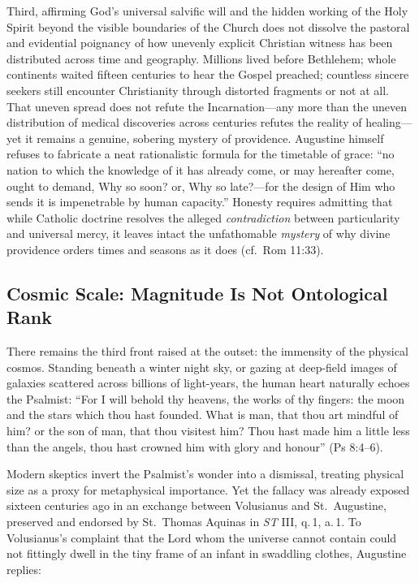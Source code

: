 Third, affirming God's universal salvific will and the hidden working of the Holy Spirit beyond the visible boundaries of the Church does not dissolve the pastoral and evidential poignancy of how unevenly explicit Christian witness has been distributed across time and geography. Millions lived before Bethlehem; whole continents waited fifteen centuries to hear the Gospel preached; countless sincere seekers still encounter Christianity through distorted fragments or not at all. That uneven spread does not refute the Incarnation---any more than the uneven distribution of medical discoveries across centuries refutes the reality of healing---yet it remains a genuine, sobering mystery of providence. Augustine himself refuses to fabricate a neat rationalistic formula for the timetable of grace: ``no nation to which the knowledge of it has already come, or may hereafter come, ought to demand, Why so soon? or, Why so late?---for the design of Him who sends it is impenetrable by human capacity.'' Honesty requires admitting that while Catholic doctrine resolves the alleged \emph{contradiction} between particularity and universal mercy, it leaves intact the unfathomable \emph{mystery} of why divine providence orders times and seasons as it does (cf.\ Rom 11:33).

\subsection{Cosmic Scale: Magnitude Is Not Ontological Rank}

There remains the third front raised at the outset: the immensity of the physical cosmos. Standing beneath a winter night sky, or gazing at deep-field images of galaxies scattered across billions of light-years, the human heart naturally echoes the Psalmist: ``For I will behold thy heavens, the works of thy fingers: the moon and the stars which thou hast founded. What is man, that thou art mindful of him? or the son of man, that thou visitest him? Thou hast made him a little less than the angels, thou hast crowned him with glory and honour'' (Ps 8:4--6).

Modern skeptics invert the Psalmist's wonder into a dismissal, treating physical size as a proxy for metaphysical importance. Yet the fallacy was already exposed sixteen centuries ago in an exchange between Volusianus and St.\ Augustine, preserved and endorsed by St.\ Thomas Aquinas in \textit{ST} III, q.\,1, a.\,1. To Volusianus's complaint that the Lord whom the universe cannot contain could not fittingly dwell in the tiny frame of an infant in swaddling clothes, Augustine replies:


